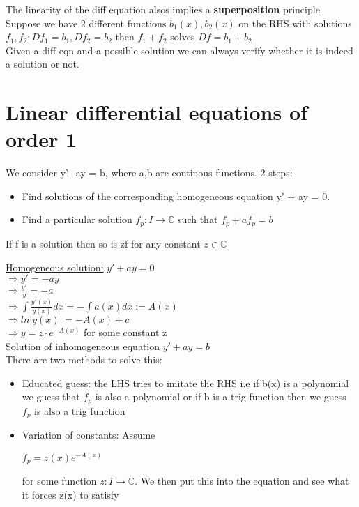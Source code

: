 \documentclass[8pt]{extreport}
\begin{document}
The linearity of the diff equation alsos implies a \textbf{superposition} principle. Suppose we have 2 different functions $b_1(x), b_2(x)$ on the RHS with solutions $f_1,f_2: Df_1 = b_1, Df_2 =b_2$ then $f_1 + f_2$ solves $Df = b_1+b_2$ \\

Given a diff eqn and a possible solution we can always verify whether it is indeed a solution or not. 

\section{Linear differential equations of order 1}

We consider y'+ay = b, where a,b are continous functions. 2 steps:
\begin{itemize}
\item Find solutions of the corresponding homogeneous equation y' + ay = 0.
\item Find a particular solution $f_p:I \rightarrow \mathbb{C}$ such that $f_p + a f_p = b$ 
\end{itemize}

If f is a solution then so is zf for any constant $z \in \mathbb{C}$

\underline{Homogeneous solution:}
$y' + ay = 0$\\
$\Rightarrow y' = -ay$\\
$\Rightarrow \frac{y'}{y} = -a$\\
$\Rightarrow \int \frac{y'(x)}{y(x)}dx = -\int a(x) dx := A(x)$\\
$\Rightarrow ln|y(x)| = -A(x) +c$\\
$\Rightarrow y = z\cdot e^{-A(x)}$ for some constant z\\

\underline{Solution of inhomogeneous equation}
$y' + ay = b$\\
There are two methods to solve this:
\begin{itemize}
\item Educated guess: the LHS tries to imitate the RHS i.e if b(x) is a polynomial we guess that $f_p$ is also a polynomial or if b is a trig function then we guess $f_p$ is also a trig function
\item Variation of constants: Assume
\begin{center}
$ f_p = z(x)e^{-A(x)}$ 
\end{center}
for some function $z:I \rightarrow \mathbb{C}$. We then put this into the equation and see what it forces z(x) to satisfy
\end{itemize} 
\end{document}
